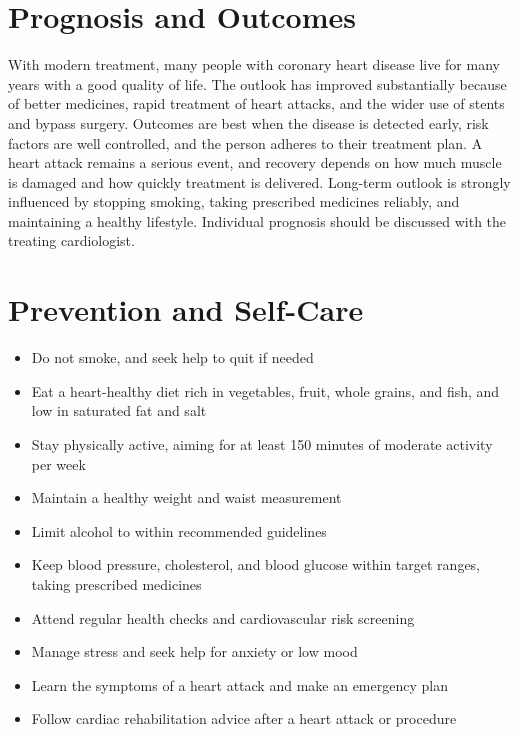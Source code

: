 \section*{Prognosis and Outcomes}
With modern treatment, many people with coronary heart disease live for many years with a good quality of life. The outlook has improved substantially because of better medicines, rapid treatment of heart attacks, and the wider use of stents and bypass surgery. Outcomes are best when the disease is detected early, risk factors are well controlled, and the person adheres to their treatment plan. A heart attack remains a serious event, and recovery depends on how much muscle is damaged and how quickly treatment is delivered. Long-term outlook is strongly influenced by stopping smoking, taking prescribed medicines reliably, and maintaining a healthy lifestyle. Individual prognosis should be discussed with the treating cardiologist.

\section*{Prevention and Self-Care}
\begin{itemize}
    \item Do not smoke, and seek help to quit if needed
    \item Eat a heart-healthy diet rich in vegetables, fruit, whole grains, and fish, and low in saturated fat and salt
    \item Stay physically active, aiming for at least 150 minutes of moderate activity per week
    \item Maintain a healthy weight and waist measurement
    \item Limit alcohol to within recommended guidelines
    \item Keep blood pressure, cholesterol, and blood glucose within target ranges, taking prescribed medicines
    \item Attend regular health checks and cardiovascular risk screening
    \item Manage stress and seek help for anxiety or low mood
    \item Learn the symptoms of a heart attack and make an emergency plan
    \item Follow cardiac rehabilitation advice after a heart attack or procedure
\end{itemize}

